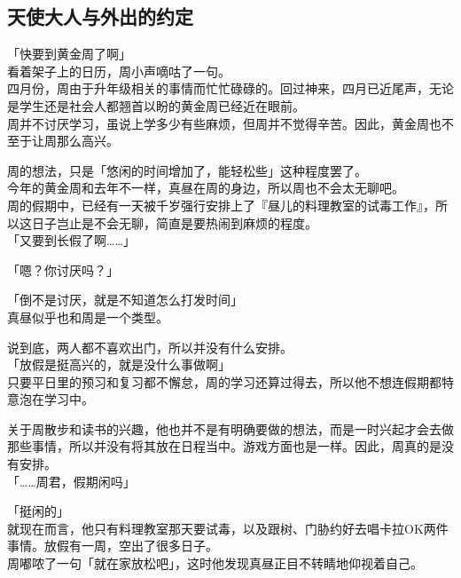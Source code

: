 \subsection{天使大人与外出的约定}

「快要到黄金周了啊」\\

看着架子上的日历，周小声嘀咕了一句。\\

四月份，周由于升年级相关的事情而忙忙碌碌的。回过神来，四月已近尾声，无论是学生还是社会人都翘首以盼的黄金周已经近在眼前。\\

周并不讨厌学习，虽说上学多少有些麻烦，但周并不觉得辛苦。因此，黄金周也不至于让周那么高兴。

周的想法，只是「悠闲的时间增加了，能轻松些」这种程度罢了。\\

今年的黄金周和去年不一样，真昼在周的身边，所以周也不会太无聊吧。\\

周的假期中，已经有一天被千岁强行安排上了『昼儿的料理教室的试毒工作』，所以这日子岂止是不会无聊，简直是要热闹到麻烦的程度。\\

「又要到长假了啊……」

「嗯？你讨厌吗？」

「倒不是讨厌，就是不知道怎么打发时间」\\

真昼似乎也和周是一个类型。

说到底，两人都不喜欢出门，所以并没有什么安排。\\

「放假是挺高兴的，就是没什么事做啊」\\

只要平日里的预习和复习都不懈怠，周的学习还算过得去，所以他不想连假期都特意泡在学习中。

关于周散步和读书的兴趣，他也并不是有明确要做的想法，而是一时兴起才会去做那些事情，所以并没有将其放在日程当中。游戏方面也是一样。因此，周真的是没有安排。\\

「……周君，假期闲吗」

「挺闲的」\\

就现在而言，他只有料理教室那天要试毒，以及跟树、门胁约好去唱卡拉OK两件事情。放假有一周，空出了很多日子。\\

周嘟哝了一句「就在家放松吧」，这时他发现真昼正目不转睛地仰视着自己。\\

